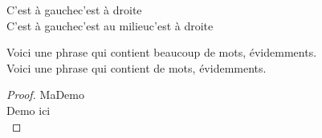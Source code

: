 \documentclass[12pt]{report}
\begin{document}
	\noindent
	C'est à gauche\hfill c'est à droite \\
	C'est à gauche\hfill c'est au milieu\hfill c'est à droite
	
	\noindent
	Voici une phrase qui contient beaucoup de mots, évidemments.\\
	Voici une phrase qui contient \phantom{beaucoup} de mots, évidemments.\\
	
	\begin{proof}
		\proofname{MaDemo} \\
		Demo ici \\
	\end{proof}
	
\end{document}
